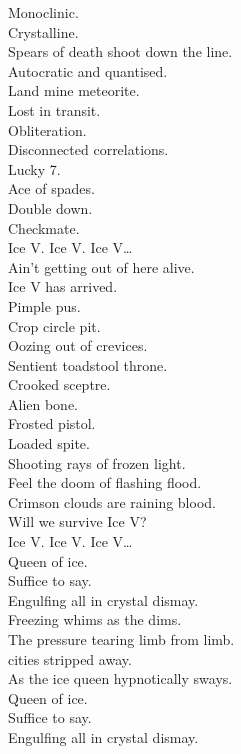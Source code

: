 Monoclinic. \\
Crystalline. \\
Spears of death shoot down the line. \\
Autocratic and quantised. \\
Land mine meteorite. \\
Lost in transit. \\
Obliteration. \\
Disconnected correlations. \\
Lucky 7. \\
Ace of spades. \\
Double down. \\
Checkmate. \\

Ice V. Ice V. Ice V… \\

Ain't getting out of here alive. \\
Ice V has arrived. \\

Pimple pus. \\
Crop circle pit. \\
Oozing out of crevices. \\
Sentient toadstool throne. \\
Crooked sceptre. \\
Alien bone. \\
Frosted pistol. \\
Loaded spite. \\
Shooting rays of frozen light. \\
Feel the doom of flashing flood. \\
Crimson clouds are raining blood. \\

Will we survive Ice V? \\

Ice V. Ice V. Ice V… \\

Queen of ice. \\
Suffice to say. \\
Engulfing all in crystal dismay. \\
Freezing whims as the  dims. \\
The pressure tearing limb from limb. \\
 cities stripped away. \\
As the ice queen hypnotically sways. \\
Queen of ice. \\
Suffice to say. \\
Engulfing all in crystal dismay. \\

